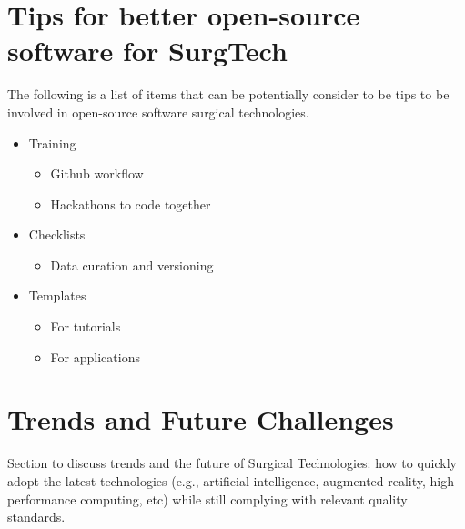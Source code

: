 \documentclass{article}
\begin{document}






\section{Tips for better open-source software for SurgTech}
The following is a list of items that can be potentially consider to be tips to be involved in open-source software surgical technologies.
\begin{itemize}
\item Training 
    \begin{itemize}
    \item Github workflow
    \item Hackathons to code together
    \end{itemize}
\item Checklists
    \begin{itemize}
    \item Data curation and versioning
    \end{itemize}
\item Templates
    \begin{itemize}
    \item For tutorials
    \item For applications
    \end{itemize}
\end{itemize}



\section{Trends and Future Challenges}
Section to discuss trends and the future of Surgical Technologies: how to quickly adopt the latest technologies (e.g., artificial intelligence, augmented reality, high-performance computing, etc) while still complying with relevant quality standards.
\end{document}
